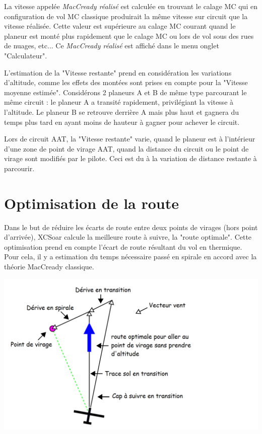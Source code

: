 La vitesse appelée  {\em MacCready réalisé} est calculée en trouvant le calage MC qui en configuration de vol MC classique produirait la même vitesse sur circuit que la vitesse réalisée. Cette valeur est supérieure au calage MC courant quand le planeur est monté plus rapidement que le calage MC ou lors de vol sous des rues de nuages, etc... Ce {\em MacCready réalisé} est affiché dans le menu \blink{} onglet "Calculateur".

L'estimation de la "Vitesse restante" prend en considération les variations d'altitude, comme les effets des montées sont prises en compte pour la "Vitesse moyenne estimée". Considérons 2 planeurs A et B de même type parcourant le même circuit : le planeur A a transité rapidement, privilégiant la vitesse à l'altitude. Le planeur B se retrouve derrière A mais plus haut et gagnera du temps plus tard en ayant moins de hauteur à gagner pour achever le circuit.

Lors de circuit AAT, la "Vitesse restante" varie, quand le planeur est à l'intérieur d'une zone de point de virage AAT, quand la distance du circuit ou le point de virage sont modifiés par le pilote. Ceci est du à la variation de distance restante à parcourir.


\section{Optimisation de la route}
Dans le but de réduire les écarts de route entre deux points de virages (hors point d'arrivée), XCSoar calcule la meilleure route à suivre, la "route optimale". Cette optimisation prend en compte l'écart de route résultant du vol en thermique. Pour cela, il y a estimation du temps nécessaire passé en spirale en accord avec la théorie MacCready classique.

\begin{center}
\begin{maxipage}
\centering
\def\svgwidth{0.8\linewidth}
\includegraphics[angle=0,width=0.8\linewidth,keepaspectratio='true']{figures/figure_optimal_cruise.png}
\end{maxipage}
\end{center}

